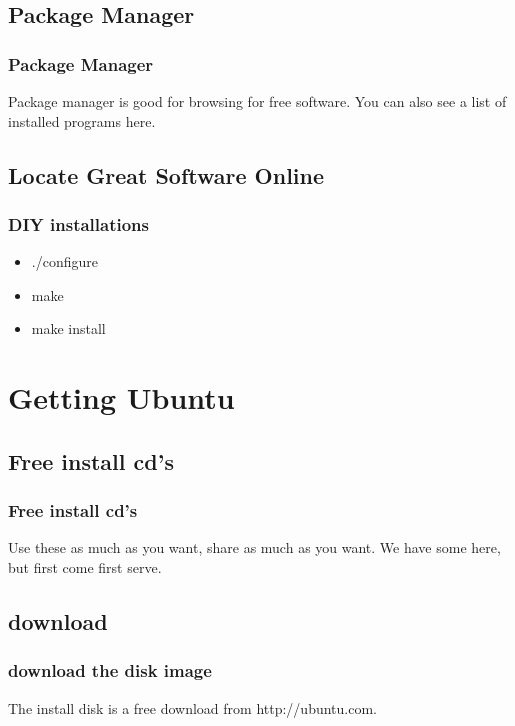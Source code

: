 \documentclass[hyperref={pdfpagelabels=false}]{beamer}
\begin{document}
\subsection{Package Manager}
\frame
{
	\frametitle{Package Manager}
	Package manager is good for browsing for free software.
	You can also see a list of installed programs here.

}
\subsection{Locate Great Software Online}
\frame
{	
	\frametitle{DIY installations}
	\begin{itemize}
	\item{./configure}
	\item{make}
	\item{make install}
	\end{itemize}

}
\section{Getting Ubuntu}
\subsection{Free install cd's}
\frame
{
    \frametitle{Free install cd's}
    Use these as much as you want, share as much as you want. We have some here, but first come first serve.
}
\subsection{download}
\frame
{
    \frametitle{download the disk image}
    The install disk is a free download from http://ubuntu.com.
}
\end{document}
